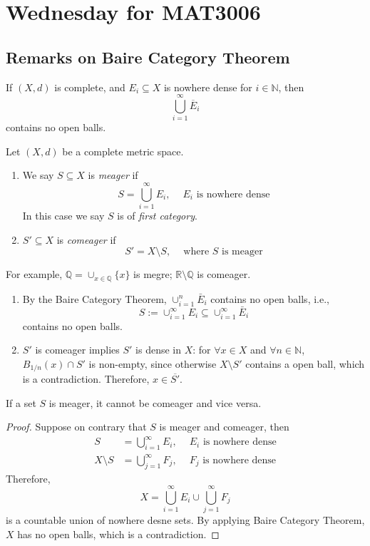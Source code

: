 \section{Wednesday for MAT3006}
\subsection{Remarks on Baire Category Theorem}
\begin{theorem}
If $(X,d)$ is complete, and $E_i\subseteq X$ is nowhere dense for $i\in\mathbb{N}$, then
\[
\bigcup_{i=1}^\infty\overline{E}_i
\]
contains no open balls.
\end{theorem}


\begin{definition}
Let $(X,d)$ be a complete metric space. 
\begin{enumerate}
\item
We say $S\subseteq X$ is \emph{meager} if 
\[
S=\bigcup_{i=1}^\infty E_i,\ \quad\text{$E_i$ is nowhere dense}
\]
In this case we say $S$ is of \emph{first category}.
\item
$S'\subseteq X$ is \emph{comeager} if
\[
S'=X\setminus S, \ \quad\text{where $S$ is meager}
\]
\end{enumerate}
\end{definition}
For example, $\mathbb{Q} = \cup_{x\in\mathbb{Q}}\{x\}$ is megre; $\mathbb{R}\setminus\mathbb{Q}$ is comeager.
\begin{remark}
\begin{enumerate}
\item
By the Baire Category Theorem, $\cup_{i=1}^n\bar{E}_i$ contains no open balls, i.e.,
\[
S:=\cup_{i=1}^\infty{E}_i\subseteq \cup_{i=1}^\infty\bar{E}_i
\]
contains no open balls.
\item
$S'$ is comeager implies $S'$ is dense in $X$: for $\forall x\in X$ and $\forall n\in\mathbb{N}$, $B_{1/n}(x)\cap S'$ is non-empty, since otherwise $X\setminus S'$ contains a open ball, which is a contradiction. Therefore, $x\in\overline{S'}$.
\end{enumerate}
\end{remark}



\begin{proposition}
If a set $S$ is meager, it cannot be comeager and vice versa.
\end{proposition}

\begin{proof}
Suppose on contrary that $S$ is meager and comeager, then
\begin{align*}
S&=\bigcup_{i=1}^\infty E_i,\ \quad\text{$E_i$ is nowhere dense}\\
X\setminus S&=\bigcup_{j=1}^\infty F_j, \ \quad\text{$F_j$ is nowhere dense}
\end{align*}
Therefore, 
\[
X = \bigcup_{i=1}^\infty E_i\cup\bigcup_{j=1}^\infty F_j
\]
is a countable union of nowhere desne sets. By applying Baire Category Theorem, $X$ has no open balls, which is a contradiction.
\end{proof}

